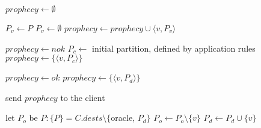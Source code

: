 \begin{algorithm}[h!]
\small

\begin{distribalgo}[1]

\vspace{1.5mm}


    \vspace{1.5mm}


    \vspace{1.5mm}

            \STATE $prophecy \leftarrow \emptyset$

                        \STATE $P_v \leftarrow P$
                    \ELSE
                        \STATE $P_v \leftarrow \emptyset$
                    \ENDIF
                    \STATE $prophecy \leftarrow prophecy \cup \langle v, P_v \rangle$
                \ENDFOR

                    \STATE $prophecy \leftarrow nok$
                \ELSE
                    \STATE $P_c \leftarrow$ initial partition, defined by application rules
                    \STATE $prophecy \leftarrow \{\langle v, P_c \rangle \}$
                \ENDIF

                    \STATE $prophecy \leftarrow ok$
                \ELSE
                    \STATE $prophecy \leftarrow \{\langle v, P_d \rangle \}$
                \ENDIF
                
            \ENDIF
            
            \STATE send $prophecy$ to the client

        \vspace{1.5mm}

            \STATE let $P_o$ be $P : \{P\} = C.dests \setminus \{$oracle, $P_d\}$
                \STATE $P_o \leftarrow P_o \setminus \{v\}$
                \STATE $P_d \leftarrow P_d \cup      \{v\}$
            \ENDIF


\end{distribalgo}
\end{algorithm}
